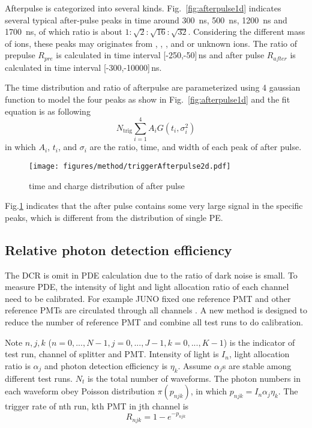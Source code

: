 Afterpulse is categorized into several kinds. Fig.~\ref{fig:afterpulse1d} indicates several typical after-pulse peaks in time around \SI{300}{ns}, \SI{500}{ns}, \SI{1200}{ns} and \SI{1700}{ns}, of which ratio is about $1:\sqrt{2}:\sqrt{16}:\sqrt{32}$. Considering the different mass of ions, these peaks may originates from , , , and  or unknown ions.
The ratio of prepulse $R_{pre}$ is calculated in time interval [-250,-50]\,ns and after pulse $R_{after}$ is calculated in time interval [-300,-10000]\,ns. 

The time distribution and ratio of afterpulse are parameterized using 4 gaussian function to model the four peaks as show in Fig.~\ref{fig:afterpulse1d} and the fit equation is as following
\begin{equation}
    N_{\mathrm{trig}}\sum_{i=1}^{4}{A_iG(t_i,\sigma_i^2)}
\end{equation}
in which $A_i$, $t_i$, and $\sigma_i$ are the ratio, time, and width of each peak of after pulse.
\begin{figure}[!htbp]
    \centering
    \texttt{[image: figures/method/triggerAfterpulse2d.pdf]}
    \caption{time and charge distribution of after pulse}
    \label{fig:afterpulse2d}
\end{figure}
Fig.\ref{fig:afterpulse2d} indicates that the after pulse contains some very large signal in the specific peaks, which is different from the distribution of single PE.

\subsection{Relative photon detection efficiency}
The DCR is omit in PDE calculation due to the ratio of dark noise is small. To measure PDE, the intensity of light and light allocation ratio of each channel need to be calibrated. For example JUNO fixed one reference PMT and other reference PMTs are circulated through all channels \cite{Wonsak_2021}. A new method is designed to reduce the number of reference PMT and combine all test runs to do calibration.

Note $n,j,k$ ($n=0,...,N-1, j=0,...,J-1, k=0,...,K-1$) is the indicator of test run, channel of splitter and PMT. Intensity of light is $I_n$, light allocation ratio is $\alpha_j$ and photon detection efficiency is $\eta_k$. Assume $\alpha_j$s are stable among different test runs. $N_t$ is the total number of waveforms. The photon numbers in each waveform obey Poisson distribution $\pi(p_{njk})$, in which $p_{njk}=I_n\alpha_j\eta_k$. The trigger rate of nth run, kth PMT in jth channel is
\begin{equation}
    \label{equ:pderate}
    R_{njk}=1-e^{-p_{njk}}
\end{equation}

